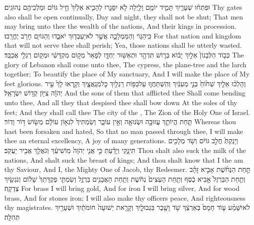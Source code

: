 {וּפִתְּח֨וּ שְׁעָרַ֧יִךְ תָּמִ֛יד יוֹמָ֥ם וָלַ֖יְלָה לֹ֣א יִסָּגֵ֑רוּ לְהָבִ֤יא אֵלַ֙יִךְ֙ חֵ֣יל גּוֹיִ֔ם וּמַלְכֵיהֶ֖ם נְהוּגִֽים׃}
{Thy gates also shall be open continually, Day and night, they shall not be shut; That men may bring unto thee the wealth of the nations, And their kings in procession.}
{כִּֽי\maqqaf הַגּ֧וֹי וְהַמַּמְלָכָ֛ה אֲשֶׁ֥ר לֹא\maqqaf יַעַבְד֖וּךְ יֹאבֵ֑דוּ וְהַגּוֹיִ֖ם חָרֹ֥ב יֶחֱרָֽבוּ׃}
{For that nation and kingdom that will not serve thee shall perish; Yea, those nations shall be utterly wasted.}
{כְּב֤וֹד הַלְּבָנוֹן֙ אֵלַ֣יִךְ יָב֔וֹא בְּר֛וֹשׁ תִּדְהָ֥ר וּתְאַשּׁ֖וּר יַחְדָּ֑ו לְפָאֵר֙ מְק֣וֹם מִקְדָּשִׁ֔י וּמְק֥וֹם רַגְלַ֖י אֲכַבֵּֽד׃}
{The glory of Lebanon shall come unto thee, The cypress, the plane-tree and the larch together; To beautify the place of My sanctuary, And I will make the place of My feet glorious.}
{וְהָלְכ֨וּ אֵלַ֤יִךְ שְׁח֙וֹחַ֙ בְּנֵ֣י מְעַנַּ֔יִךְ וְהִֽשְׁתַּחֲו֛וּ עַל\maqqaf כַּפּ֥וֹת רַגְלַ֖יִךְ כׇּל\maqqaf מְנַֽאֲצָ֑יִךְ וְקָ֤רְאוּ לָךְ֙ עִ֣יר יְהֹוָ֔ה צִיּ֖וֹן קְד֥וֹשׁ יִשְׂרָאֵֽל׃}
{And the sons of them that afflicted thee Shall come bending unto thee, And all they that despised thee shall bow down At the soles of thy feet; And they shall call thee The city of the \lord, The Zion of the Holy One of Israel.}
{תַּ֧חַת הֱיוֹתֵ֛ךְ עֲזוּבָ֥ה וּשְׂנוּאָ֖ה וְאֵ֣ין עוֹבֵ֑ר וְשַׂמְתִּיךְ֙ לִגְא֣וֹן עוֹלָ֔ם מְשׂ֖וֹשׂ דּ֥וֹר וָדֽוֹר׃}
{Whereas thou hast been forsaken and hated, So that no man passed through thee, I will make thee an eternal excellency, A joy of many generations.}
{וְיָנַקְתְּ֙ חֲלֵ֣ב גּוֹיִ֔ם וְשֹׁ֥ד מְלָכִ֖ים תִּינָ֑קִי וְיָדַ֗עַתְּ כִּ֣י אֲנִ֤י יְהֹוָה֙ מֽוֹשִׁיעֵ֔ךְ וְגֹאֲלֵ֖ךְ אֲבִ֥יר יַעֲקֹֽב׃}
{Thou shalt also suck the milk of the nations, And shalt suck the breast of kings; And thou shalt know that I the \lord\space am thy Saviour, And I, the Mighty One of Jacob, thy Redeemer.}
{תַּ֣חַת הַנְּחֹ֜שֶׁת אָבִ֣יא זָהָ֗ב וְתַ֤חַת הַבַּרְזֶל֙ אָ֣בִיא כֶ֔סֶף וְתַ֤חַת הָעֵצִים֙ נְחֹ֔שֶׁת וְתַ֥חַת הָאֲבָנִ֖ים בַּרְזֶ֑ל וְשַׂמְתִּ֤י פְקֻדָּתֵךְ֙ שָׁל֔וֹם וְנֹגְשַׂ֖יִךְ צְדָקָֽה׃}
{For brass I will bring gold, And for iron I will bring silver, And for wood brass, And for stones iron; I will also make thy officers peace, And righteousness thy magistrates.}
{לֹא\maqqaf יִשָּׁמַ֨ע ע֤וֹד חָמָס֙ בְּאַרְצֵ֔ךְ שֹׁ֥ד וָשֶׁ֖בֶר בִּגְבוּלָ֑יִךְ וְקָרָ֤את יְשׁוּעָה֙ חוֹמֹתַ֔יִךְ וּשְׁעָרַ֖יִךְ תְּהִלָּֽה׃}

